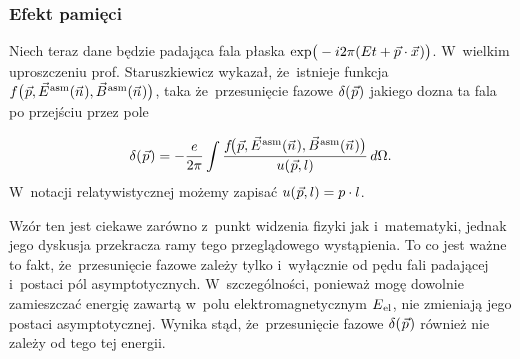 \documentclass[10pt,t]{beamer}
\begin{document}
\begin{frame}
  \frametitle{Efekt pamięci}


  Niech teraz dane będzie padająca fala płaska
  $\exp\!\big( -i 2\pi ( E t + \vec{p} \cdot \vec{x} \hspace{0.05em} ) \big)$. W~wielkim
  uproszczeniu prof. Staruszkiewicz wykazał, że~istnieje funkcja
  $f\big( \hspace{0.05em} \vec{p}, \vec{E}^{ \hspace{0.05em} \text{asm} }( \vec{n} \hspace{0.05em} ), \vec{B}^{ \hspace{0.05em} \text{asm} }( \vec{n} \hspace{0.05em} ) \big)$, taka
  że~przesunięcie fazowe $\delta( \hspace{0.05em} \vec{p} \hspace{0.05em} )$ jakiego
  dozna ta fala po przejściu przez pole

  \vspace{-1em}


  \begin{equation}
    \label{eq:Pola-asymptotyczne-i-efekt-pamieci-01}
    \delta( \hspace{0.05em} \vec{p} \hspace{0.05em} ) =
    -\frac{ e }{ 2\pi }
    \int \frac{ f\!\big( \hspace{0.05em} \vec{p}, \vec{E}^{ \hspace{0.05em} \text{asm} }( \vec{n} \hspace{0.05em} ),
      \vec{B}^{ \hspace{0.05em} \text{asm} }( \vec{n} \hspace{0.05em} ) \big) }{ u( \hspace{0.05em} \vec{p}, l ) } \, d\Omega.
  \end{equation}
  W~notacji relatywistycznej możemy zapisać
  $u( \hspace{0.05em} \vec{p}, l ) = p \cdot l$.

  Wzór ten jest ciekawe zarówno z~punkt widzenia fizyki jak i~matematyki,
  jednak jego dyskusja przekracza ramy tego przeglądowego wystąpienia. To co
  jest ważne to fakt, że~przesunięcie fazowe zależy \alert{tylko
    i~wyłącznie} od pędu fali padającej i~postaci pól asymptotycznych.
  W~szczególności, ponieważ mogę dowolnie zamieszczać energię zawartą
  w~polu elektromagnetycznym $E_{ \hspace{0.05em} \text{el} }$, nie zmieniają jego
  postaci asymptotycznej. Wynika stąd, że~przesunięcie fazowe
  $\delta( \hspace{0.05em} \vec{p} \hspace{0.05em} )$ również nie zależy od tego tej
  energii.

\end{frame}
\end{document}
